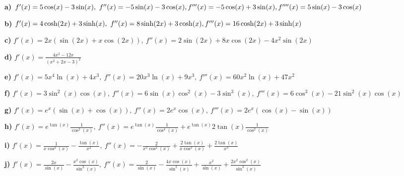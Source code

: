 {

\textbf{a)} $f'(x)=5 \cos(x)-3\sin(x), \
f''(x) = -5 \sin(x)-3\cos(x), \\
f'''(x)= -5 \cos(x) +3\sin(x), 
f''''(x)= 5 \sin(x) -3 \cos(x)$

\textbf{b)}
$f'(x) = 4 \cosh(2x) +3\sinh(x), \
f''(x) = 8 \sinh(2x) +3 \cosh(x), \\
f'''(x) = 16 \cosh(2x)+3 \sinh(x)$

\textbf{c)}
$f'(x) = 2x( \sin(2x) +x \cos(2x)), \
f''(x)= 2 \sin(2x) +8x \cos(2x) -4x^2 \sin(2x)  $

\textbf{d)}
$f'(x)   = \frac{4x^2-12x}{(x^2+2x-3)^2}$

\textbf{e)}
$
f'(x)  = 5x^4 \ln(x) +4x^3, \
f''(x) = 20 x^3 \ln(x) + 9x^3, \
f'''(x) = 60 x^2 \ln(x) +47 x^2      
$

\textbf{f)}
$
f'(x) = 3 \sin^2(x) \cos(x), \
f''(x) = 6 \sin(x) \cos^2(x) -3 \sin^3(x), \
f'''(x)   = 6 \cos^3(x) -21 \sin^2(x) \cos(x)             
$

\textbf{g)}
$
f'(x)  = e^x (\sin(x)+\cos(x)), \
f''(x) = 2 e^x \cos(x), \
f'''(x)  = 2 e^x (\cos(x)-\sin(x))             
$

\textbf{h)}
$
f'(x) =   e^{\tan(x)} \frac{1}{\cos^2(x)}, \
f''(x) = e^{\tan(x)} \frac{1}{\cos^4(x)} + e^{\tan(x)} 2 \tan(x)  \frac{1}{\cos^2(x)}
$

\textbf{i)}
$
f'(x)  = \frac{1}{x \cos^2(x)} -\frac{\tan(x)}{x^2}, \
f''(x)  =   - \frac{2}{x^2 \cos^2(x)} +\frac{2 \tan(x)}{x \cos^2(x)} + \frac{2 \tan(x)}{x^3}    
$

\textbf{j)}
$
f'(x)  = \frac{2x}{\sin(x)} - \frac{x^2 \cos(x)}{\sin^2(x)}, \
f''(x) =  \frac{2}{\sin(x)} - \frac{4x\cos(x)}{\sin^2(x)}+ \frac{x^2}{\sin(x)} + \frac{2x^2\cos^2(x)}{\sin^3(x)}
$

                                                      
}                                    
